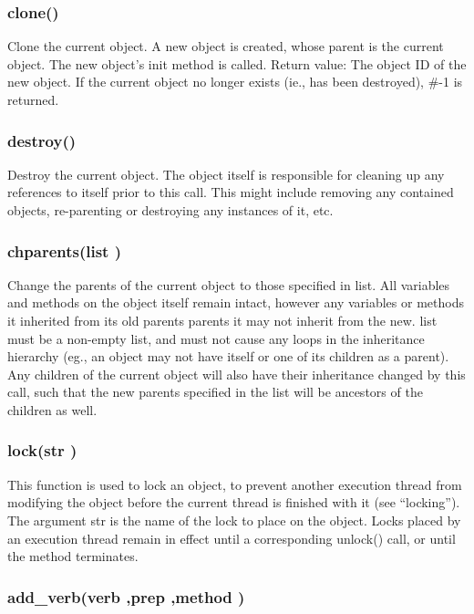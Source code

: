 \subsubsection{\func clone()}

Clone the current object.  A new object is created, whose parent
is the current object.  The new object's init method is called.
Return value:  The object ID of the new object.  If the current
object no longer exists (ie., has been destroyed), \#-1 is returned.

\subsubsection{\func destroy()}

Destroy the current object.  The object itself is responsible for cleaning
up any references to itself prior to this call.  This might include
removing any contained objects, re-parenting or destroying any
instances of it, etc.

\subsubsection{\func chparents({\funcarg list })}

Change the parents of the current object to those specified in
{\funcarg list}.  All variables and methods on the object itself
remain intact, however any variables or methods it inherited from
its old parents parents it may not inherit from the new. 
{\funcarg list} must be a non-empty list, and must not cause any loops
in the inheritance hierarchy (eg., an object may not have itself or one
of its children as a parent).  Any children of the current object will
also have their inheritance changed by this call, such that the new
parents specified in the list will be ancestors of the children as well.

\subsubsection{\func lock({\funcarg str })}

This function is used to lock an object, to prevent another execution
thread from modifying the object before the current thread is finished
with it (see ``locking'').  The argument {\funcarg str } is the
name of the lock to place on the object.  Locks placed by an execution
thread remain in effect until a corresponding {\func unlock()} call, or until
the method terminates.

\subsubsection{\func add\_verb({\funcarg verb },{\funcarg prep },{\funcarg method })}


